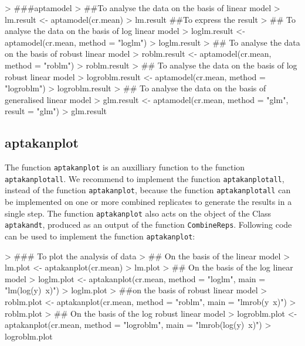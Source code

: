 \documentclass[11pt]{article}
\newcommand{\code}[1]{{\tt #1}}
\begin{document}
\begin{Schunk}
\begin{Sinput}
> ###aptamodel
> ##To analyse the data on the basis of linear model
> lm.result <- aptamodel(cr.mean)
> lm.result ##To express the result
> ## To analyse the data on the basis of log linear model
> loglm.result <- aptamodel(cr.mean, method = "loglm")
> loglm.result
> ## To analyse the data on the basis of robust linear model
> roblm.result <- aptamodel(cr.mean, method = "roblm")
> roblm.result
> ## To analyse the data on the basis of log robust linear model
> logroblm.result <- aptamodel(cr.mean, method = "logroblm")
> logroblm.result
> ## To analyse the data on the basis of generalised linear model
> glm.result <- aptamodel(cr.mean, method = "glm", result = "glm")
> glm.result
\end{Sinput}
\end{Schunk}

\subsection{aptakanplot}
The function \code{aptakanplot} is an auxilliary function to the function \code{aptakanplotall}.
We recommend to implement the function \code{aptakanplotall}, instead of the function
\code{aptakanplot}, because the function \code{aptakanplotall} can be implemented on one or more
combined replicates to generate the results in a single step. The function \code{aptakanplot} also
acts on the object of the Class \code{aptakandt}, produced as an output of the function
\code{CombineReps}. Following code can be used to implement the function \code{aptakanplot}:

\begin{Schunk}
\begin{Sinput}
> ### To plot the analysis of data
> ## On the basis of the linear model
> lm.plot <- aptakanplot(cr.mean)
> lm.plot
> ## On the basis of the log linear model
> loglm.plot <- aptakanplot(cr.mean, method = "loglm", main = "lm(log(y)~x)")
> loglm.plot
> ##on the basis of robust linear model
> roblm.plot <- aptakanplot(cr.mean, method = "roblm", main = "lmrob(y~x)")
> roblm.plot
> ## On the basis of the log robust linear model
> logroblm.plot <- aptakanplot(cr.mean, method = "logroblm", main = "lmrob(log(y)~x)")
> logroblm.plot
\end{Sinput}
\end{Schunk}
\end{document}
